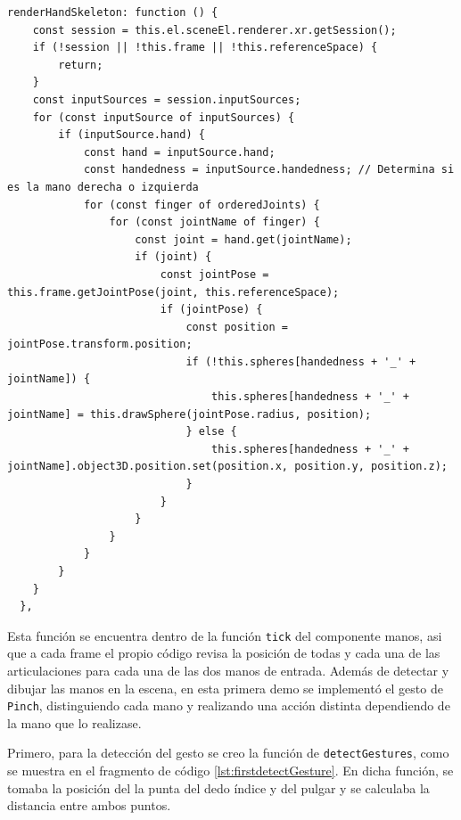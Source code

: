 \documentclass[a4paper, 12pt]{book}
\begin{document}
\begin{lstlisting}[caption=Dibujo de las manos en la escena, captionpos=b, label=lst:manos-codigo]
  renderHandSkeleton: function () {
    const session = this.el.sceneEl.renderer.xr.getSession();
    if (!session || !this.frame || !this.referenceSpace) {
        return;
    }
    const inputSources = session.inputSources;
    for (const inputSource of inputSources) {
        if (inputSource.hand) {
            const hand = inputSource.hand;
            const handedness = inputSource.handedness; // Determina si es la mano derecha o izquierda
            for (const finger of orderedJoints) {
                for (const jointName of finger) {
                    const joint = hand.get(jointName);
                    if (joint) {
                        const jointPose = this.frame.getJointPose(joint, this.referenceSpace);
                        if (jointPose) {
                            const position = jointPose.transform.position;
                            if (!this.spheres[handedness + '_' + jointName]) {
                                this.spheres[handedness + '_' + jointName] = this.drawSphere(jointPose.radius, position);
                            } else {
                                this.spheres[handedness + '_' + jointName].object3D.position.set(position.x, position.y, position.z);
                            }
                        }
                    }
                }
            }
        }
    }
  },
\end{lstlisting}

Esta función se encuentra dentro de la función \texttt{tick} del componente manos, asi que a cada frame el propio código revisa la posición de todas y cada una de las articulaciones para cada una 
de las dos manos de entrada.
Además de detectar y dibujar las manos en la escena, en esta primera demo se implementó el gesto de \texttt{Pinch}, distinguiendo cada mano y realizando una acción distinta dependiendo de la mano que lo realizase. 

Primero, para la detección del gesto se creo la función de \texttt{detectGestures}, como se muestra en el fragmento de código \ref{lst:firstdetectGesture}. En dicha función, se tomaba la posición del la punta del dedo índice y del pulgar y se calculaba la distancia entre ambos puntos.
\end{document}
